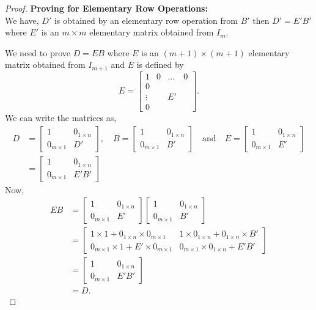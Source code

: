 \documentclass[12pt, a4paper]{article}
\theoremstyle{definition}
\theoremstyle{remark}
\begin{document}
\begin{proof}
\textbf{Proving for Elementary Row Operations:}\\
We have, $D'$ is obtained by an elementary row operation from $B'$ then $D' = E'B'$ where $E'$ is an $m \times m$ elementary matrix obtained from $I_m$.

We need to prove $D = EB$ where $E$ is an $(m+1) \times (m+1)$ elementary matrix obtained from $I_{m+1}$ and $E$ is defined by
\[
E = \left[
\begin{array}{c|ccc}
1 & 0 & \dots & 0 \\ \hline
0 &   &       &   \\
\vdots & & E'    &   \\
0 &   &       &   
\end{array}
\right].
\]
We can write the matrices as,
\begin{align*}
    D &= \begin{bmatrix} 1 & 0_{1 \times n} \\ 0_{m \times 1} & D' \end{bmatrix}, \quad 
B = \begin{bmatrix} 1 & 0_{1 \times n} \\ 0_{m \times 1} & B' \end{bmatrix} \quad \text{and} \quad 
E = \begin{bmatrix} 1 & 0_{1 \times n} \\ 0_{m \times 1} & E' \end{bmatrix} \\
&= \begin{bmatrix} 1 & 0_{1 \times n} \\ 0_{m \times 1} & E'B' \end{bmatrix}
\end{align*}
Now,
\begin{align*}
EB &= \begin{bmatrix} 1 & 0_{1 \times n} \\ 0_{m \times 1} & E' \end{bmatrix} \begin{bmatrix} 1 & 0_{1 \times n} \\ 0_{m \times 1} & B' \end{bmatrix} \\
&= \begin{bmatrix} 1 \times 1 + 0_{1 \times n} \times 0_{m \times 1} & 1 \times 0_{1 \times n} + 0_{1 \times n} \times B' \\ 0_{m \times 1} \times 1 + E' \times 0_{m \times 1} & 0_{m \times 1} \times 0_{1 \times n} + E'B' \end{bmatrix} \\
&= \begin{bmatrix} 1 & 0_{1 \times n} \\ 0_{m \times 1} & E'B' \end{bmatrix} \\
&= D.
\end{align*}


\end{proof}
\end{document}

